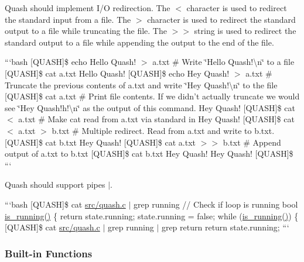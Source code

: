 \begin{DoxyItemize}
\item Quash should implement I/\-O redirection. The {\ttfamily $<$} character is used to redirect the standard input from a file. The {\ttfamily $>$} character is used to redirect the standard output to a file while truncating the file. The {\ttfamily $>$$>$} string is used to redirect the standard output to a file while appending the output to the end of the file.
\end{DoxyItemize}

```bash \mbox{[}Q\-U\-A\-S\-H\mbox{]}\$ echo Hello Quash! $>$ a.\-txt \# Write \char`\"{}\-Hello Quash!\textbackslash{}n\char`\"{} to a file \mbox{[}Q\-U\-A\-S\-H\mbox{]}\$ cat a.\-txt Hello Quash! \mbox{[}Q\-U\-A\-S\-H\mbox{]}\$ echo Hey Quash! $>$ a.\-txt \# Truncate the previous contents of a.\-txt and write \char`\"{}\-Hey Quash!\textbackslash{}n\char`\"{} to the file \mbox{[}Q\-U\-A\-S\-H\mbox{]}\$ cat a.\-txt \# Print file contents. If we didn't actually truncate we would see \char`\"{}\-Hey Quash!h!\textbackslash{}n\char`\"{} as the output of this command. Hey Quash! \mbox{[}Q\-U\-A\-S\-H\mbox{]}\$ cat $<$ a.\-txt \# Make cat read from a.\-txt via standard in Hey Quash! \mbox{[}Q\-U\-A\-S\-H\mbox{]}\$ cat $<$ a.\-txt $>$ b.\-txt \# Multiple redirect. Read from a.\-txt and write to b.\-txt. \mbox{[}Q\-U\-A\-S\-H\mbox{]}\$ cat b.\-txt Hey Quash! \mbox{[}Q\-U\-A\-S\-H\mbox{]}\$ cat a.\-txt $>$$>$ b.\-txt \# Append output of a.\-txt to b.\-txt \mbox{[}Q\-U\-A\-S\-H\mbox{]}\$ cat b.\-txt Hey Quash! Hey Quash! \mbox{[}Q\-U\-A\-S\-H\mbox{]}\$ ```


\begin{DoxyItemize}
\item Quash should support pipes {\ttfamily $\vert$}.
\end{DoxyItemize}

```bash \mbox{[}Q\-U\-A\-S\-H\mbox{]}\$ cat \hyperlink{quash_8c}{src/quash.\-c} $\vert$ grep running // Check if loop is running bool \hyperlink{quash_8c_a61da580fc69a74f3ef17956ba5fd88a0}{is\-\_\-running()} \{ return state.\-running; state.\-running = false; while (\hyperlink{quash_8c_a61da580fc69a74f3ef17956ba5fd88a0}{is\-\_\-running()}) \{ \mbox{[}Q\-U\-A\-S\-H\mbox{]}\$ cat \hyperlink{quash_8c}{src/quash.\-c} $\vert$ grep running $\vert$ grep return return state.\-running; ```

\subsubsection*{Built-\/in Functions}

